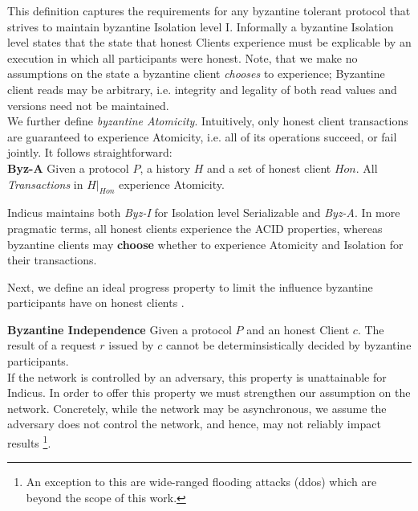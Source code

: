 This definition captures the requirements for any byzantine tolerant protocol that strives to maintain byzantine Isolation level I.
Informally a byzantine Isolation level states that the state that honest Clients experience must be explicable by an execution in which all participants were honest. Note, that we make no assumptions on the state a byzantine client \textit{chooses} to experience; Byzantine client reads may be arbitrary, i.e. integrity and legality of both read values and versions need not be maintained. \\

We further define \textit{byzantine Atomicity}. Intuitively, only honest client transactions are guaranteed to experience Atomicity, i.e. all of its operations succeed, or fail jointly. It follows straightforward:\\
\textbf{Byz-A} Given a protocol $P$, a history $H$ and a set of honest client $Hon$. All \textit{Transactions} in $H|_{Hon}$ experience Atomicity.\\

Indicus maintains both \textit{Byz-I} for Isolation level Serializable and \textit{Byz-A}. 
In more pragmatic terms, all honest clients experience the ACID properties, whereas byzantine clients may \textbf{choose} whether to experience Atomicity and Isolation for their transactions.

Next, we define an ideal progress property to limit the influence byzantine participants have on honest clients . 

\textbf{Byzantine Independence}
Given a protocol $P$ and an honest Client $c$. The result of a request $r$ issued by $c$ cannot be determinsistically decided by byzantine participants.  \\

If the network is controlled by an adversary, this property is unattainable for Indicus. 
In order to offer this property we must strengthen our assumption on the network. Concretely, while the network may be asynchronous, we assume the adversary does not control the network, and hence, may not reliably impact results \footnote{An exception to this are wide-ranged flooding attacks (ddos) which are beyond the scope of this work.}. \\

